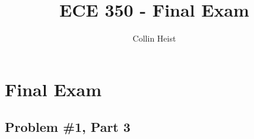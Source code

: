 \documentclass[11pt]{article}
\author{Collin Heist}
\title{ECE 350 - Final Exam}
\begin{document}
    
    
    \maketitle
    
    

    
    \hypertarget{final-exam}{%
\section{Final Exam}\label{final-exam}}

\hypertarget{problem-1-part-3}{%
\subsection{Problem \#1, Part 3}\label{problem-1-part-3}}
\end{document}
